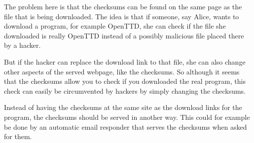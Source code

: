 The problem here is that the checksums can be found on the same page as the file that is being downloaded. The idea is that if someone, say Alice, wants to  download a program, for example OpenTTD, she can check if the file she downloaded is really OpenTTD instead of a possibly malicious file placed there by a hacker.

But if the hacker can replace the download link to that file, she can also change other aspects of the served webpage, like the checksums. So although it seems that the checksums allow you to check if you downloaded the real program, this check can easily be circumvented by hackers by simply changing the checksums. 

Instead of having the checksums at the same site as the download links for the program, the checksums should be served in another way. This could for example be done by an automatic email responder that serves the checksums when asked for them. 